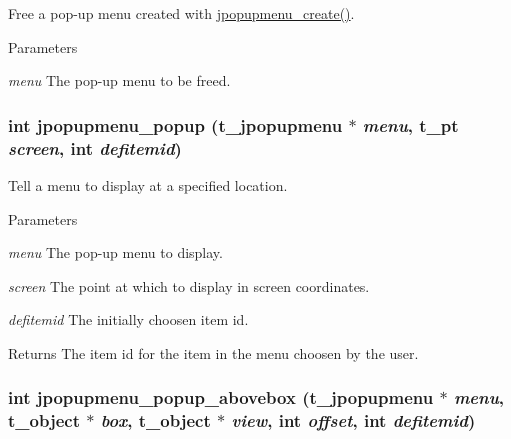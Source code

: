 Free a pop-\/up menu created with \hyperlink{group__jpopupmenu_ga4ee6ff8775c88750bc002db49bdaa98b}{jpopupmenu\_\-create()}. 
\begin{DoxyParams}{Parameters}
\item[{\em menu}]The pop-\/up menu to be freed. \end{DoxyParams}
\hypertarget{group__jpopupmenu_ga53b05326e6d6f2def7573941d97699c0}{
\subsubsection[{jpopupmenu\_\-popup}]{\setlength{\rightskip}{0pt plus 5cm}int jpopupmenu\_\-popup ({\bf t\_\-jpopupmenu} $\ast$ {\em menu}, \/  {\bf t\_\-pt} {\em screen}, \/  int {\em defitemid})}}
\label{group__jpopupmenu_ga53b05326e6d6f2def7573941d97699c0}


Tell a menu to display at a specified location. 
\begin{DoxyParams}{Parameters}
\item[{\em menu}]The pop-\/up menu to display. \item[{\em screen}]The point at which to display in screen coordinates. \item[{\em defitemid}]The initially choosen item id. \end{DoxyParams}
\begin{DoxyReturn}{Returns}
The item id for the item in the menu choosen by the user. 
\end{DoxyReturn}
\hypertarget{group__jpopupmenu_ga18c3434bd119af47b3ec605b659c1654}{
\subsubsection[{jpopupmenu\_\-popup\_\-abovebox}]{\setlength{\rightskip}{0pt plus 5cm}int jpopupmenu\_\-popup\_\-abovebox ({\bf t\_\-jpopupmenu} $\ast$ {\em menu}, \/  {\bf t\_\-object} $\ast$ {\em box}, \/  {\bf t\_\-object} $\ast$ {\em view}, \/  int {\em offset}, \/  int {\em defitemid})}}
\label{group__jpopupmenu_ga18c3434bd119af47b3ec605b659c1654}


